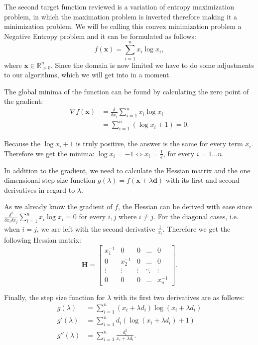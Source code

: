 \documentclass[a4paper,english,titlepage,12pt]{article}
\newcommand{\vect}[1]{\ensuremath{\mathbf{#1}}}
\begin{document}
The second target function reviewed is a variation of entropy maximization problem, in which the maximation problem is inverted therefore making it a minimization problem. We will be calling this convex minimization problem a Negative Entropy problem and it can be formulated as follows:
\begin{equation}
	f(\vect{x}) = \sum_{i=1}^{n} x_i \log x_i,
\end{equation}
where $\vect{x} \in \mathbb{R}_{> 0}^n$. Since the domain is now limited we have to do some adjustments to our algorithms, which we will get into in a moment.

The global minima of the function can be found by calculating the zero point of the gradient:
\begin{align}
    \nabla f(\vect{x}) &= \frac{\delta}{\delta x_i} \sum_{i=1}^{n} x_i \log x_i \\
                      &= \sum_{i=1}^{n} (\log x_i + 1) = 0.
\end{align}

Because the $\log x_i + 1$ is truly positive, the answer is the same for every term $x_i$. Therefore we get the minima: $\log x_i = -1 \Leftrightarrow x_i = \frac{1}{e}$, for every $i = 1 \dots n$.

In addition to the gradient, we need to calculate the Hessian matrix and the one dimensional step size function $g(\lambda) = f(\vect{x} + \lambda \vect{d})$ with its first and second derivatives in regard to $\lambda$.

As we already know the gradient of $f$, the Hessian can be derived with ease since $\frac{\delta^2}{\delta x_i \delta x_j} \sum_{i=1}^{n} x_i \log x_i = 0$ for every $i, j$ where $i \neq j$. For the diagonal cases, i.e. when $i = j$, we are left with the second derivative $\frac{1}{x_i}$. Therefore we get the following Hessian matrix:
\begin{equation}
    \textbf{H} =
    \begin{bmatrix}
    x_1^{-1} & 0        & 0      & \dots  & 0      \\
    0        & x_2^{-1} & 0      & \dots  & 0      \\
    \vdots   & \vdots   & \vdots & \ddots & \vdots \\
    0        & 0        & 0      & \dots  & x_n^{-1}
\end{bmatrix}.
\end{equation}

Finally, the step size function for $\lambda$ with its first two derivatives are as follows:
\begin{align}
    g(\lambda) &= \sum_{i=1}^{n} (x_i + \lambda d_i) \log (x_i + \lambda d_i) \\
    g'(\lambda) &= \sum_{i=1}^{n} d_i (\log(x_i + \lambda d_i) + 1) \\
    g''(\lambda) &= \sum_{i=1}^{n} \frac{d_i^2}{x_i + \lambda d_i}.
\end{align}
\end{document}
